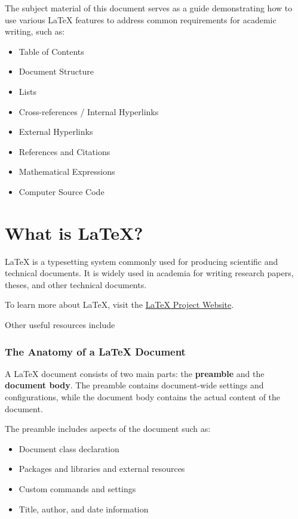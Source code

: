 \documentclass[12pt]{article}
\begin{document}
The subject material of this document serves as a guide demonstrating how to use various \LaTeX{} features to address common requirements for academic writing, such as:

\begin{itemize}
  \item Table of Contents
  \item Document Structure
  \item Lists
  \item Cross-references / Internal Hyperlinks
  \item External Hyperlinks
  \item References and Citations
  \item Mathematical Expressions
  \item Computer Source Code
\end{itemize}

\section{What is LaTeX?}
\label{sec:what-is-latex}

\LaTeX{} is a typesetting system commonly used for producing scientific and technical documents. It is widely used in academia for writing research papers, theses, and other technical documents. 

To learn more about \LaTeX{}, visit the \href{https://www.latex-project.org/}{\LaTeX{} Project Website}. 

Other useful resources include \cite{mittelbach_2023_the}

\subsubsection{The Anatomy of a LaTeX Document}
\label{sec:the-anatomy-of-a-latex-document}

A \LaTeX{} document consists of two main parts: the \textbf{preamble} and the \textbf{document body}. The preamble contains document-wide settings and configurations, while the document body contains the actual content of the document.

The preamble includes aspects of the document such as:

\begin{itemize}
  \item Document class declaration
  \item Packages and libraries and external resources
  \item Custom commands and settings
  \item Title, author, and date information
\end{itemize}
\end{document}
